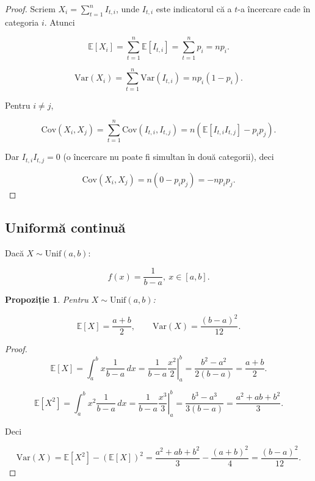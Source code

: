 \documentclass[12pt]{article}
\theoremstyle{plain}
\newtheorem{proposition}{Propoziție}
\begin{document}
\begin{proof}
Scriem $X_i = \sum_{t=1}^n I_{t,i}$, unde $I_{t,i}$ este indicatorul că a $t$-a încercare cade în categoria $i$.
Atunci


\[
\mathbb{E}[X_i] = \sum_{t=1}^n \mathbb{E}[I_{t,i}] = \sum_{t=1}^n p_i = np_i.
\]




\[
\mathrm{Var}(X_i) = \sum_{t=1}^n \mathrm{Var}(I_{t,i}) = n p_i(1-p_i).
\]


Pentru $i\neq j$,


\[
\mathrm{Cov}(X_i,X_j) = \sum_{t=1}^n \mathrm{Cov}(I_{t,i},I_{t,j})
= n\left(\mathbb{E}[I_{t,i}I_{t,j}] - p_ip_j\right).
\]


Dar $I_{t,i}I_{t,j}=0$ (o încercare nu poate fi simultan în două categorii), deci


\[
\mathrm{Cov}(X_i,X_j) = n(0 - p_ip_j) = -np_ip_j.
\]


\end{proof}

\subsection{Uniformă continuă}

Dacă $X \sim \mathrm{Unif}(a,b)$:


\[
f(x) = \frac{1}{b-a},\ x\in[a,b].
\]



\begin{proposition}
Pentru $X \sim \mathrm{Unif}(a,b)$:


\[
\mathbb{E}[X] = \frac{a+b}{2},\qquad
\mathrm{Var}(X) = \frac{(b-a)^2}{12}.
\]


\end{proposition}

\begin{proof}


\[
\mathbb{E}[X] = \int_a^b x \frac{1}{b-a}\,dx
= \frac{1}{b-a}\left.\frac{x^2}{2}\right|_a^b
= \frac{b^2-a^2}{2(b-a)} = \frac{a+b}{2}.
\]




\[
\mathbb{E}[X^2] = \int_a^b x^2 \frac{1}{b-a}\,dx
= \frac{1}{b-a}\left.\frac{x^3}{3}\right|_a^b
= \frac{b^3-a^3}{3(b-a)} = \frac{a^2+ab+b^2}{3}.
\]


Deci


\[
\mathrm{Var}(X) = \mathbb{E}[X^2] - (\mathbb{E}[X])^2
= \frac{a^2+ab+b^2}{3} - \frac{(a+b)^2}{4}
= \frac{(b-a)^2}{12}.
\]


\end{proof}
\end{document}
